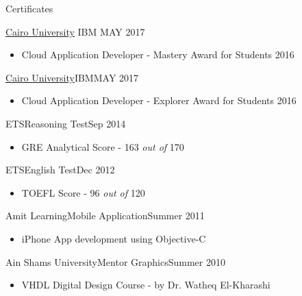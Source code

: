 \documentclass[]{mcdowellcv}
\begin{document}
\begin{cvsection}{Certificates}
\begin{cvsubsection}
			{\href{https://www.youracclaim.com/badges/8db17289-9e32-4ad2-9e28-32bd62c58775/public_url} {Cairo University}}
			{IBM}
			{MAY 2017}
			\begin{itemize}
				\item Cloud Application Developer - Mastery Award for Students 2016
			\end{itemize}
		\end{cvsubsection}
		\begin{cvsubsection}{\href{https://www.youracclaim.com/badges/6bf35fd2-4ce7-463c-a8aa-edf84ac69683/public_url}{Cairo University}}{IBM}{MAY 2017}
			\begin{itemize}
				\item Cloud Application Developer - Explorer Award for Students 2016
			\end{itemize}
		\end{cvsubsection}
		
		\begin{cvsubsection}{ETS}{Reasoning Test}{Sep 2014}
			\begin{itemize}
				\item GRE Analytical Score - 163 \textit{out of} 170
			\end{itemize}
		\end{cvsubsection}
		
		\begin{cvsubsection}{ETS}{English Test}{Dec 2012}
			\begin{itemize}
				\item TOEFL Score - 96 \textit{out of} 120
			\end{itemize}
		\end{cvsubsection}
		
		\begin{cvsubsection}{Amit Learning}{Mobile Application}{Summer 2011}
			\begin{itemize}
				\item iPhone App development using Objective-C
			\end{itemize}
		\end{cvsubsection}
		
		\begin{cvsubsection}{Ain Shams University}{Mentor Graphics}{Summer 2010}
			\begin{itemize}
				\item VHDL Digital Design Course - by Dr. Watheq El-Kharashi
			\end{itemize}
		\end{cvsubsection}
		
	\end{cvsection}	
	
\end{document}
